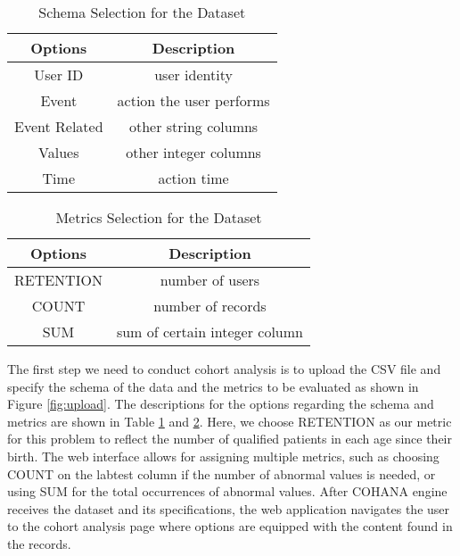 \begin{table}[tb!]
\begin{center}
    \begin{tabular}{ |c|c| }
        \hline
        Options & Description \\[0.5ex] 
        \hline\hline
        User ID & user identity \\
        \hline
        Event & action the user performs\\
        \hline
        Event Related & other string columns\\
        \hline
        Values & other integer columns\\
        \hline
        Time & action time \\
        \hline
    \end{tabular}
\end{center}
\caption{Schema Selection for the Dataset}
\label{table:schema}
    \vspace{-3em}
\end{table}

\begin{table}[tb!]
\begin{center}
    \begin{tabular}{ | c | c | }
        \hline
        Options & Description \\[0.5ex] 
        \hline\hline
        RETENTION & number of users \\
        \hline
        COUNT & number of records \\
        \hline
        SUM & sum of certain integer column \\
        \hline
    \end{tabular}
\end{center}
\caption{Metrics Selection for the Dataset}
\label{table:metrics}
    \vspace{-3em}
\end{table}

The first step we need to conduct cohort analysis is to upload the CSV file and specify the schema of the data and the metrics to be evaluated as shown in Figure \ref{fig:upload}. 
The descriptions for the options regarding the schema and metrics are shown in Table \ref{table:schema} and \ref{table:metrics}. 
Here, we choose RETENTION as our metric for this problem to reflect the number of qualified patients in each age since their birth. 
The web interface allows for assigning multiple metrics, such as choosing COUNT on the labtest column if the number of abnormal values is needed, or using SUM for the total occurrences of abnormal values. 
After COHANA engine receives the dataset and its specifications, the web application navigates the user to the cohort analysis page where options are equipped with the content found in the records.

